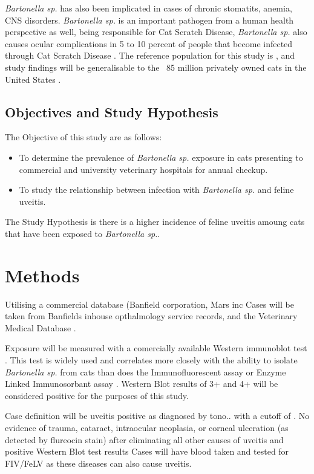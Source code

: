 \documentclass[12pt]{article}
\begin{document}
		\emph{Bartonella sp.} has also been implicated in cases of chronic stomatits, anemia, CNS disorders\cite{Nasir2005}.
		\emph{Bartonella sp.} is an important pathogen from a human health perspective as well, being responsible for Cat Scratch Disease, 
		\emph{Bartonella sp.} also causes ocular complications in 5 to 10 percent of people that become infected through Cat Scratch Disease \cite{Wade2000}.
		The reference population for this study is , and study findings will be generalisable to the ~85 million privately owned cats in the United States \cite{HSUSown}.

		\subsection{Objectives and Study Hypothesis}
			The Objective of this study are as follows: 
				\begin{itemize}
					\item To determine the prevalence of \emph{Bartonella sp.} exposure in cats presenting to commercial and university veterinary hospitals for annual checkup.
					\item To study the relationship between infection with \emph{Bartonella sp.} and feline uveitis.
				\end{itemize}
			The Study Hypothesis is there is a higher incidence of feline uveitis amoung cats that have been exposed to \emph{Bartonella sp.}.
\section{Methods}
	Utilising a commercial database (Banfield corporation, Mars inc
	Cases will be taken from Banfields inhouse opthalmology service records, and the Veterinary Medical Database \cite{UniversityVeterinary}.

	Exposure will be measured with a comercially available Western immunoblot test \cite{febart}. This test is widely used and correlates more closely with the ability to isolate \emph{Bartonella sp.} from cats than does the Immunofluorescent assay or Enzyme Linked Immunosorbant assay \cite{Jr1995}. 
	Western Blot results of 3+ and 4+ will be considered positive for the purposes of this study. 


	Case definition will be uveitis positive as diagnosed by tono.. with a cutoff of .
	No evidence of trauma, cataract, intraocular neoplasia, or corneal ulceration (as detected by flureocin stain) 
	after eliminating all other causes of uveitis and positive Western Blot test results
	Cases will have blood taken and tested for FIV/FeLV as these diseases can also cause uveitis.
\end{document}
